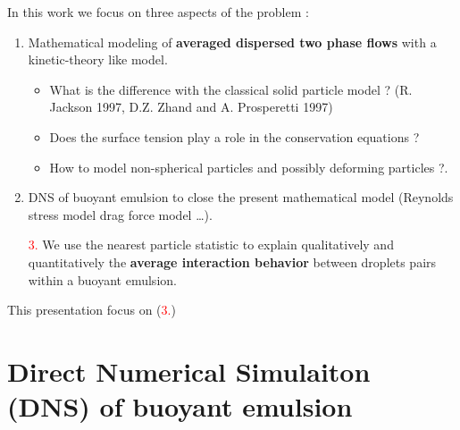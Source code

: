 \documentclass{sintefbeamer}
\begin{document}
\begin{frame}
  {In this work we focus on three aspects of the problem :}
  \Large
  \begin{enumerate}
    \item Mathematical modeling of \textbf{averaged dispersed two phase flows} with a kinetic-theory like model. 
    \begin{itemize}
      \item What is the difference with the classical solid particle model ? (R. Jackson 1997, D.Z. Zhand and A. Prosperetti 1997)
      \item Does the surface tension play a role in the conservation equations ? 
      \item How to model non-spherical particles and possibly deforming particles ?. 
    \end{itemize}  
    \item DNS of buoyant emulsion to close the present mathematical model (Reynolds stress model drag force model \ldots). 
    \item[\textcolor{red}{3.}] We use the nearest particle statistic to explain qualitatively and quantitatively the \textbf{average interaction behavior} between droplets pairs within a buoyant emulsion. 
  \end{enumerate}
  This presentation focus on (\textcolor{red}{3.})
\end{frame}


\section{Direct Numerical Simulaiton (DNS) of buoyant emulsion}
\section*{}
\end{document}
